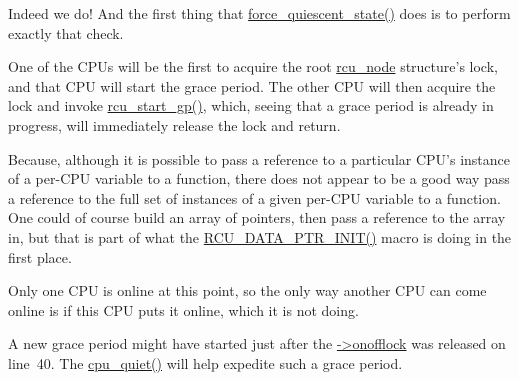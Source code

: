 
	Indeed we do!
	And the first thing that \url{force_quiescent_state()} does
	is to perform exactly that check.


	One of the CPUs will be the first to acquire the root
	\url{rcu_node} structure's lock, and that CPU will start
	the grace period.
	The other CPU will then acquire the lock and invoke
	\url{rcu_start_gp()}, which, seeing that a grace period
	is already in progress, will immediately release the
	lock and return.


	Because, although it is possible to pass a reference to
	a particular CPU's instance of a per-CPU variable to a function,
	there does not appear to be a good way pass a reference to
	the full set of instances of a given per-CPU variable to
	a function.
	One could of course build an array of pointers, then pass a
	reference to the array in, but that is part of what
	the \url{RCU_DATA_PTR_INIT()} macro is doing in the first place.


	Only one CPU is online at this point, so the only way another
	CPU can come online is if this CPU puts it online, which it
	is not doing.


	A new grace period might have started just after the
	\url{->onofflock} was released on line~40.
	The \url{cpu_quiet()} will help expedite such a grace period.

